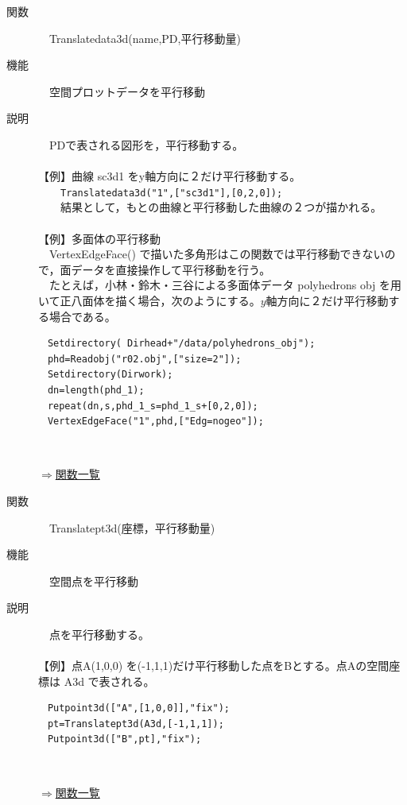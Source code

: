 \documentclass[papersize,a4paper,12pt,uplatex]{jsarticle}
\begin{document}
\begin{description}
\hypertarget{translatedata3d}{}
\item[関数]　Translatedata3d(name,PD,平行移動量)
\item[機能]　空間プロットデータを平行移動
\item[説明]　PDで表される図形を，平行移動する。\\
　\\
【例】曲線 sc3d1 をy軸方向に２だけ平行移動する。\\
　　\verb|Translatedata3d("1",["sc3d1"],[0,2,0]);|\\
　　結果として，もとの曲線と平行移動した曲線の２つが描かれる。\\
　\\
【例】多面体の平行移動\\
　VertexEdgeFace() で描いた多角形はこの関数では平行移動できないので，面データを直接操作して平行移動を行う。\\
　たとえば，小林・鈴木・三谷による多面体データ  polyhedrons obj  を用いて正八面体を描く場合，次のようにする。$y$軸方向に２だけ平行移動する場合である。\\
\begin{verbatim}
　Setdirectory( Dirhead+"/data/polyhedrons_obj");
　phd=Readobj("r02.obj",["size=2"]);
　Setdirectory(Dirwork);
　dn=length(phd_1);
　repeat(dn,s,phd_1_s=phd_1_s+[0,2,0]);
　VertexEdgeFace("1",phd,["Edg=nogeo"]);
\end{verbatim}
　　　

\begin{flushright} \hyperlink{functionlist3d}{$\Rightarrow$関数一覧}\end{flushright}

\hypertarget{translatept3d}{}
\item[関数]　Translatept3d(座標，平行移動量)
\item[機能]　空間点を平行移動
\item[説明]　点を平行移動する。\\
　\\
【例】点A(1,0,0) を(-1,1,1)だけ平行移動した点をBとする。点Aの空間座標は A3d で表される。 
\begin{verbatim}
　Putpoint3d(["A",[1,0,0]],"fix");
　pt=Translatept3d(A3d,[-1,1,1]);
　Putpoint3d(["B",pt],"fix");
\end{verbatim}
　\\
\begin{flushright} \hyperlink{functionlist3d}{$\Rightarrow$関数一覧}\end{flushright}


\end{description}
\end{document}

